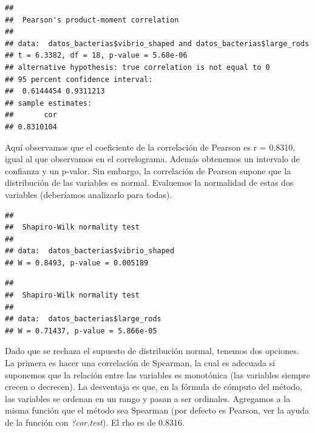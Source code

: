\documentclass[
]{book}
\newenvironment{Shaded}{\begin{snugshade}}{\end{snugshade}}
\newcommand{\FunctionTok}[1]{\textcolor[rgb]{0.00,0.00,0.00}{#1}}
\newcommand{\NormalTok}[1]{#1}
\newcommand{\SpecialCharTok}[1]{\textcolor[rgb]{0.00,0.00,0.00}{#1}}
\begin{document}
\begin{Shaded}
\end{Shaded}

\begin{verbatim}
## 
##  Pearson's product-moment correlation
## 
## data:  datos_bacterias$vibrio_shaped and datos_bacterias$large_rods
## t = 6.3382, df = 18, p-value = 5.68e-06
## alternative hypothesis: true correlation is not equal to 0
## 95 percent confidence interval:
##  0.6144454 0.9311213
## sample estimates:
##       cor 
## 0.8310104
\end{verbatim}

Aquí observamos que el coeficiente de la correlación de Pearson es r = 0.8310, igual al que observamos en el correlograma. Además obtenemos un intervalo de confianza y un p-valor. Sin embargo, la correlación de Pearson supone que la distribución de las variables es normal. Evaluemos la normalidad de estas dos variables (deberíamos analizarlo para todas).

\begin{Shaded}
\end{Shaded}

\begin{verbatim}
## 
##  Shapiro-Wilk normality test
## 
## data:  datos_bacterias$vibrio_shaped
## W = 0.8493, p-value = 0.005189
\end{verbatim}

\begin{Shaded}
\end{Shaded}

\begin{verbatim}
## 
##  Shapiro-Wilk normality test
## 
## data:  datos_bacterias$large_rods
## W = 0.71437, p-value = 5.866e-05
\end{verbatim}

Dado que se rechaza el supuesto de distribución normal, tenemos dos opciones. La primera es hacer una correlación de Spearman, la cual es adecuada si suponemos que la relación entre las variables es monotónica (las variables siempre crecen o decrecen). La desventaja es que, en la fórmula de cómputo del método, las variables se ordenan en un rango y pasan a ser ordinales. Agregamos a la misma función que el método sea Spearman (por defecto es Pearson, ver la ayuda de la función con \emph{?cor.test}). El rho es de 0.8316.
\end{document}
